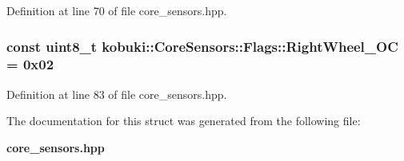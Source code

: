 \-Definition at line 70 of file core\-\_\-sensors.\-hpp.

\subsubsection[{\-Right\-Wheel\-\_\-\-O\-C}]{\setlength{\rightskip}{0pt plus 5cm}const uint8\-\_\-t {\bf kobuki\-::\-Core\-Sensors\-::\-Flags\-::\-Right\-Wheel\-\_\-\-O\-C} = 0x02\hspace{0.3cm}{\ttfamily  [static]}}\label{structkobuki_1_1CoreSensors_1_1Flags_acd0f2a4e0f3bc264289ebc67f7ef4316}


\-Definition at line 83 of file core\-\_\-sensors.\-hpp.



\-The documentation for this struct was generated from the following file\-:\begin{DoxyCompactItemize}
\item 
{\bf core\-\_\-sensors.\-hpp}\end{DoxyCompactItemize}
